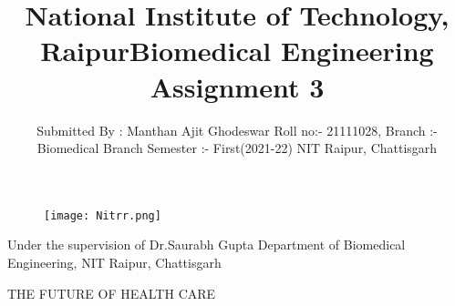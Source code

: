 \documentclass[12pt]{article}
\title{National Institute of Technology, Raipur}
\begin{document}
\maketitle
\begin{figure}[h]
\centering
\texttt{[image: Nitrr.png]}
\end{figure}
\bigskip
\bigskip
\centering
\begin{Large}
\title{Biomedical Engineering Assignment 3}
\end{Large}

\bigskip
\bigskip
\bigskip
\bigskip

\raggedright 
\begin{multicols}{2}
\author{Submitted By : Manthan Ajit Ghodeswar
\linebreak Roll no:- 21111028,
\linebreak Branch :- Biomedical Branch
\linebreak Semester :- First(2021-22)
\linebreak NIT Raipur, Chattisgarh}
\columnbreak
\columnbreak


Under the supervision of
\linebreak Dr.Saurabh Gupta
\linebreak Department of Biomedical Engineering,
\linebreak NIT Raipur, Chattisgarh
\end{multicols}


\clearpage

\centering
\begin{Huge}
THE FUTURE OF HEALTH CARE
\end{Huge}
\linebreak
\linebreak
\linebreak
\end{document}
